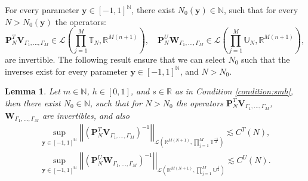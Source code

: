 \documentclass{article}
\newtheorem{lemma}[theorem]{Lemma}
\newcommand{\IN}{{\mathbb N}}
\newcommand{\IR}{{\mathbb R}}
\newcommand{\IU}{{\mathbb U}}
\newcommand{\IT}{{\mathbb T}}
\newcommand{\by}{\bm{y}}
\begin{document}
For every parameter $\by \in [-1,1]^{\IN}$, there exist $N_0(\by) \in \IN$, such that for every $N> N_0(\by)$ the operators:
$$
\mathbf{P}_N^T \mathbf{V}_{\Gamma_1,\hdots,\Gamma_M} \in \mathcal{L}\left(\prod_{j=1}^M \IT_N, \IR^{M(n+1)}\right), \quad \mathbf{P}_N^U \mathbf{W}_{\Gamma_1,\hdots,\Gamma_M} \in \mathcal{L}\left(\prod_{j=1}^M \IU_N, \IR^{M(n+1)}\right),
$$ 
are invertible. The following result ensure that we can select $N_0$ such that the inverses exist for every parameter $\by \in [-1,1]^{\IN}$, and $N > N_0$.
\begin{lemma}
\label{lemma:discreteinverse}
Let $m \in \IN$, $h \in [0,1]$, and $s \in \IR$ as in Condition \ref{condition:smh}, then there exist $N_0 \in \IN$, such that for $N> N_0$ the operators $\mathbf{P}_N^T \mathbf{V}_{\Gamma_1,\hdots,\Gamma_M}$, $\mathbf{W}_{\Gamma_1,\hdots,\Gamma_M}$ are invertibles, and also 
\begin{align*}
\sup_{\by \in [-1,1]^\IN}\left\vert \left\vert (\mathbf{P}_N^T \mathbf{V}_{\Gamma_1,\hdots,\Gamma_M})^{-1} \right \vert \right \vert_{\mathcal{L}\left(\IR^{M(N+1)}, \prod_{j=1}^M \IT^{\frac{-1}{2}}\right)} \lesssim C^T(N), \\ 
\sup_{\by \in [-1,1]^\IN}\left\vert \left\vert (\mathbf{P}_N^U \mathbf{W}_{\Gamma_1,\hdots,\Gamma_M})^{-1} \right \vert \right \vert_{\mathcal{L}\left(\IR^{M(N+1)}, \prod_{j=1}^M \IU^{\frac{1}{2}}\right)} \lesssim C^U(N). 
\end{align*}
\end{lemma}
\end{document}
